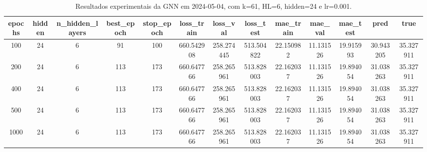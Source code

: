 \begin{table}[h]
\centering
\caption{Resultados experimentais da GNN em 2024-05-04, com k=61, HL=6, hidden=24 e lr=0.001.}
\label{tab:gnn_results_k61_hl6_h24_d20240504}
\begin{tabular}{ccccccccccccc}
\toprule
epochs & hidden & n\_hidden\_layers & best\_epoch & stop\_epoch & loss\_train & loss\_val & loss\_test & mae\_train & mae\_val & mae\_test & pred & true \\
\midrule
100 & 24 & 6 & 91 & 100 & 660.542908 & 258.274445 & 513.504822 & 22.150982 & 11.131526 & 19.915993 & 30.943205 & 35.327911 \\
200 & 24 & 6 & 113 & 173 & 660.647766 & 258.265961 & 513.828003 & 22.162037 & 11.131526 & 19.894054 & 31.038263 & 35.327911 \\
400 & 24 & 6 & 113 & 173 & 660.647766 & 258.265961 & 513.828003 & 22.162037 & 11.131526 & 19.894054 & 31.038263 & 35.327911 \\
500 & 24 & 6 & 113 & 173 & 660.647766 & 258.265961 & 513.828003 & 22.162037 & 11.131526 & 19.894054 & 31.038263 & 35.327911 \\
1000 & 24 & 6 & 113 & 173 & 660.647766 & 258.265961 & 513.828003 & 22.162037 & 11.131526 & 19.894054 & 31.038263 & 35.327911 \\
\bottomrule
\end{tabular}
\end{table}
